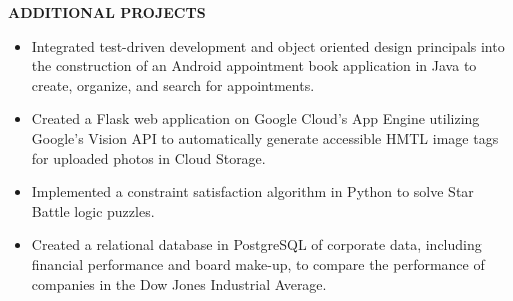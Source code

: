 \documentclass[11pt]{article}
\begin{document}
\medbreak \noindent
%
%
\noindent
\makebox[0pt][l]{\rule[-.2\baselineskip]{\linewidth}{.3mm}}\large{\textbf{ADDITIONAL PROJECTS}}
\begin{itemize}[leftmargin=*, itemsep=0pt, topsep=5pt]
	\item Integrated test-driven development and object oriented design principals into the construction of an Android appointment book application in Java to create, organize, and search for appointments.
	\item Created a Flask web application on Google Cloud’s App Engine utilizing Google’s Vision API to automatically generate accessible HMTL image tags for uploaded photos in Cloud Storage.
	\item Implemented a constraint satisfaction algorithm in Python to solve Star Battle logic puzzles.
	\item Created a relational database in PostgreSQL of corporate data, including financial performance and board make-up, to compare the performance of companies in the Dow Jones Industrial Average.
\end{itemize} 
\smallskip
\end{document}
